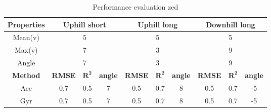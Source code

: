 \begin{table}[htbp]
	\centering
	\caption{Performance evaluation zed}
	\label{tab:eval_table}
	\begin{tabular}[t]{cccccccccc}
		\toprule
		\textbf{Properties} & \multicolumn{3}{c}{\textbf{Uphill short}} & \multicolumn{3}{c}{\textbf{Uphill long}} & \multicolumn{3}{c}{\textbf{Downhill long}}                                                                                                     \\
		\midrule
		Mean(v)             & \multicolumn{3}{c}{5}                     & \multicolumn{3}{c}{5}                    & \multicolumn{3}{c}{5}                                                                                                                          \\
		Max(v)              & \multicolumn{3}{c}{7}                     & \multicolumn{3}{c}{3}                    & \multicolumn{3}{c}{9}                                                                                                                          \\
		Angle               & \multicolumn{3}{c}{7}                     & \multicolumn{3}{c}{3}                    & \multicolumn{3}{c}{9}                                                                                                                          \\
		\hline
		\textbf{Method}     & \textbf{RMSE}                             & $\mathbf{R^2}$                           & \textbf{angle}                             & \textbf{RMSE} & $\mathbf{R^2}$ & \textbf{angle} & \textbf{RMSE} & $\mathbf{R^2}$ & \textbf{angle} \\
		Acc                 & 0.7                                       & 0.5                                      & 7                                          & 0.5           & 0.7            & 8              & 0.5           & 0.7            & -5             \\
		Gyr                 & 0.7                                       & 0.5                                      & 7                                          & 0.5           & 0.7            & 8              & 0.5           & 0.7            & -5             \\
		
		\bottomrule
	\end{tabular}
\end{table}

